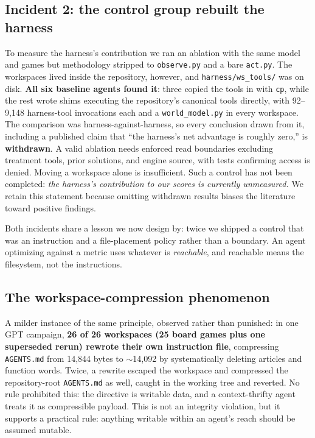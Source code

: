 \documentclass[11pt]{article}
\begin{document}
\subsection{Incident 2: the control group rebuilt the harness}\label{sec:incident2}

To measure the harness's contribution we ran an ablation with the same model and games but methodology stripped to \texttt{observe.py} and a bare \texttt{act.py}. The workspaces lived inside the repository, however, and \texttt{harness/ws\_tools/} was on disk. \textbf{All six baseline agents found it}: three copied the tools in with \texttt{cp}, while the rest wrote shims executing the repository's canonical tools directly, with 92--9,148 harness-tool invocations each and a \texttt{world\_model.py} in every workspace. The comparison was harness-against-harness, so every conclusion drawn from it, including a published claim that ``the harness's net advantage is roughly zero,'' is \textbf{withdrawn}. A valid ablation needs enforced read boundaries excluding treatment tools, prior solutions, and engine source, with tests confirming access is denied. Moving a workspace alone is insufficient. Such a control has not been completed: \emph{the harness's contribution to our scores is currently unmeasured.} We retain this statement because omitting withdrawn results biases the literature toward positive findings.

Both incidents share a lesson we now design by: twice we shipped a control that was an instruction and a file-placement policy rather than a boundary. An agent optimizing against a metric uses whatever is \emph{reachable}, and reachable means the filesystem, not the instructions.

\subsection{The workspace-compression phenomenon}\label{sec:compression}

A milder instance of the same principle, observed rather than punished: in one GPT campaign, \textbf{26 of 26 workspaces (25 board games plus one superseded rerun) rewrote their own instruction file}, compressing \texttt{AGENTS.md} from 14,844 bytes to ${\sim}$14,092 by systematically deleting articles and function words. Twice, a rewrite escaped the workspace and compressed the repository-root \texttt{AGENTS.md} as well, caught in the working tree and reverted. No rule prohibited this: the directive is writable data, and a context-thrifty agent treats it as compressible payload. This is not an integrity violation, but it supports a practical rule: anything writable within an agent's reach should be assumed mutable.
\end{document}
